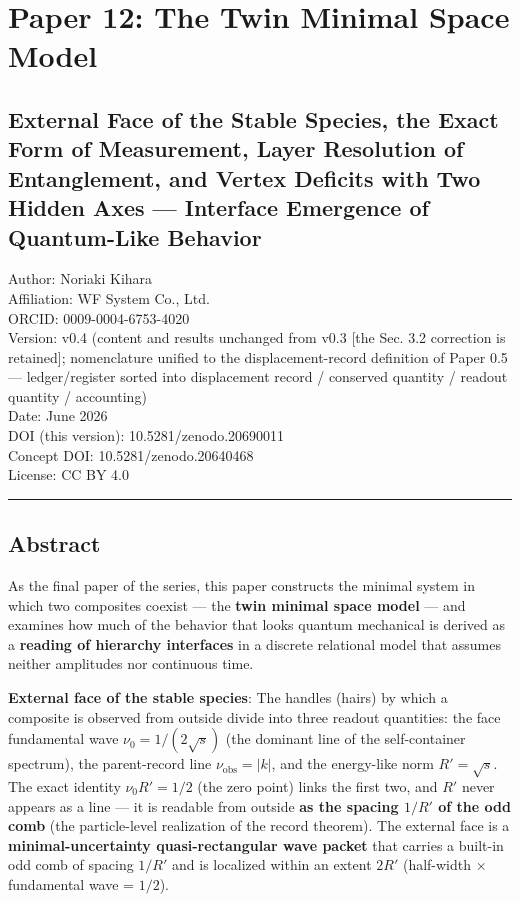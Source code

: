 \documentclass[
]{ltjsarticle}
\author{}
\date{}
\begin{document}
\section{Paper 12: The Twin Minimal Space
Model}\label{paper-12-the-twin-minimal-space-model}

\subsection{External Face of the Stable Species, the Exact Form of
Measurement, Layer Resolution of Entanglement, and Vertex Deficits with
Two Hidden Axes --- Interface Emergence of Quantum-Like
Behavior}\label{external-face-of-the-stable-species-the-exact-form-of-measurement-layer-resolution-of-entanglement-and-vertex-deficits-with-two-hidden-axes-interface-emergence-of-quantum-like-behavior}

Author: Noriaki Kihara\\
Affiliation: WF System Co., Ltd.\\
ORCID: 0009-0004-6753-4020\\
Version: v0.4 (content and results unchanged from v0.3 {[}the Sec. 3.2
correction is retained{]}; nomenclature unified to the
displacement-record definition of Paper 0.5 --- ledger/register sorted
into displacement record / conserved quantity / readout quantity /
accounting)\\
Date: June 2026\\
DOI (this version): 10.5281/zenodo.20690011\\
Concept DOI: 10.5281/zenodo.20640468\\
License: CC BY 4.0

\begin{center}\rule{0.5\linewidth}{0.5pt}\end{center}

\subsection{Abstract}\label{abstract}

As the final paper of the series, this paper constructs the minimal
system in which two composites coexist --- the \textbf{twin minimal
space model} --- and examines how much of the behavior that looks
quantum mechanical is derived as a \textbf{reading of hierarchy
interfaces} in a discrete relational model that assumes neither
amplitudes nor continuous time.

\textbf{External face of the stable species}: The handles (hairs) by
which a composite is observed from outside divide into three readout
quantities: the face fundamental wave \(\nu_0=1/(2\sqrt s)\) (the
dominant line of the self-container spectrum), the parent-record line
\(\nu_{\mathrm{obs}}=|k|\), and the energy-like norm \(R'=\sqrt s\). The
exact identity \(\nu_0 R'=1/2\) (the zero point) links the first two,
and \(R'\) never appears as a line --- it is readable from outside
\textbf{as the spacing \(1/R'\) of the odd comb} (the particle-level
realization of the record theorem). The external face is a
\textbf{minimal-uncertainty quasi-rectangular wave packet} that carries
a built-in odd comb of spacing \(1/R'\) and is localized within an
extent \(2R'\) (half-width × fundamental wave = \(1/2\)).
\end{document}
